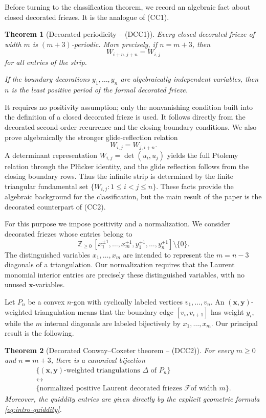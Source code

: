 \documentclass[amstex,11pt,reqno]{amsart}
\newtheorem{theorem}{Theorem}[section]
\theoremstyle{definition}
\newcommand{\Z}{\mathbb Z}
\newcommand{\cF}{\mathcal F}
\newcommand{\bx}{\bm{x}}
\newcommand{\by}{\bm{y}}
\begin{document}
Before turning to the classification theorem, we record an algebraic fact about closed decorated friezes. It is the analogue of (CC1).

\begin{theorem}[Decorated periodicity -- (DCC1)]\label{thm:intro-periodicity}
Every closed decorated frieze of width $m$ is $(m+3)$-periodic. More precisely, if $n=m+3$, then
\[
 W_{i+n,j+n}=W_{i,j}
\]
for all entries of the strip.

If the boundary decorations $y_1,\ldots,y_n$ are algebraically independent variables, then $n$ is the least positive period of the formal decorated frieze.
\end{theorem}

It requires no positivity
assumption; only the nonvanishing condition built into the definition of a closed decorated frieze is used.
It follows directly from the decorated second-order recurrence and the closing boundary conditions. We also prove algebraically the stronger glide-reflection relation
\[
 W_{i,j}=W_{j,i+n}.
\]
A determinant representation $W_{i,j}=\det(u_i,u_j)$ yields the full Ptolemy relation through the Pl\"ucker identity, and the glide reflection follows from the closing boundary rows. Thus the infinite strip is determined by the finite triangular fundamental set
$\{W_{i,j}:1\leq i<j\leq n\}$. These facts provide the algebraic background for the classification, but the main result of the paper is the decorated counterpart of (CC2).

For this purpose we impose positivity and a normalization. We consider decorated friezes whose entries belong to
\[
 \Z_{\geq0}\,
 [x_1^{\pm1},\ldots,x_m^{\pm1},
 y_1^{\pm1},\ldots,y_n^{\pm1}]
 \setminus\{0\}.
\]
The distinguished variables $x_1,\ldots,x_m$ are intended to represent the $m=n-3$ diagonals of a triangulation. Our normalization requires that the Laurent monomial interior entries are precisely these distinguished variables, with no unused $\bx$-variables.

Let $P_n$ be a convex $n$-gon with cyclically labeled vertices
$v_1,\ldots,v_n$. An $(\bx,\by)$-weighted triangulation means that the boundary edge $[v_i,v_{i+1}]$ has weight $y_i$, while the $m$ internal diagonals are labeled bijectively by $x_1,\ldots,x_m$. Our principal result is the following.

\begin{theorem}[Decorated Conway--Coxeter theorem -- (DCC2)]
\label{thm:intro-classification}
For every $m\geq0$ and $n=m+3$, there is a canonical bijection
\begin{equation*}
\begin{gathered}
 \{(\bx,\by)\text{-weighted triangulations $\Delta$ of }P_n\}\\
 \longleftrightarrow\\
 \{\text{normalized positive Laurent decorated friezes $\cF$
 of width }m\}.
\end{gathered}
\end{equation*}
Moreover, the quiddity entries are given directly by the explicit
geometric formula \eqref{eq:intro-quiddity}.
\end{theorem}
\end{document}
